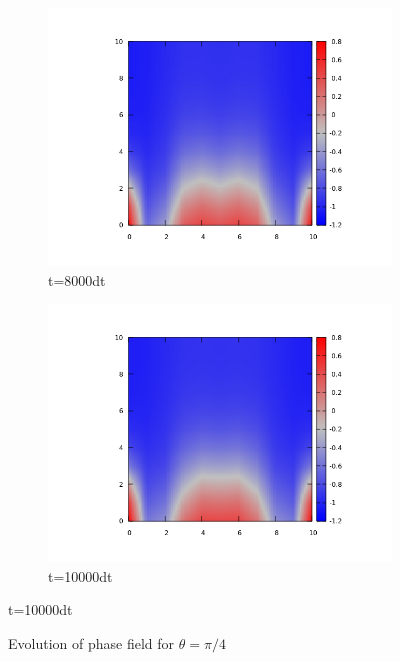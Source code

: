 \documentclass{article}
\begin{document}
\begin{figure}
\centering
\begin{subfigure}{.5\textwidth}
  \centering
  \includegraphics[width=1.0\linewidth]{8000contact.png}
  \caption{t=8000dt}
  \label{fig:sub1}
\end{subfigure}%
\begin{subfigure}{.5\textwidth}
  \centering
  \includegraphics[width=1.0\linewidth]{10000contact.png}
  \caption{t=10000dt}
  \label{fig:sub2}
\end{subfigure}
\label{fig:test}
\end{figure}
\begin{figure}
\caption {Evolution of phase field for $\theta = \pi/4$ }
\end{figure}
\end{document}
